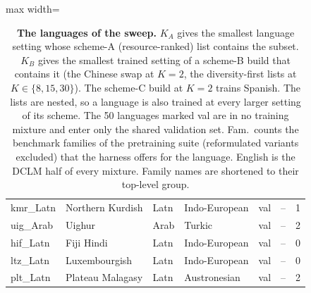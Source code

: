 \begin{table}[p]
\begin{minipage}[t]{0.49\textwidth}
\begin{adjustbox}{max width=\linewidth}
\begin{tabular}[t]{llllrrr}
kmr\_Latn & Northern Kurdish & Latn & Indo-European & val & -- & 1 \\
uig\_Arab & Uighur & Arab & Turkic & val & -- & 2 \\
hif\_Latn & Fiji Hindi & Latn & Indo-European & val & -- & 0 \\
ltz\_Latn & Luxembourgish & Latn & Indo-European & val & -- & 0 \\
plt\_Latn & Plateau Malagasy & Latn & Austronesian & val & -- & 2 \\
\bottomrule
\end{tabular}
\end{adjustbox}
\end{minipage}
\caption{\textbf{The languages of the sweep.} $K_A$ gives the smallest language setting whose scheme-A (resource-ranked) list contains the subset. $K_B$ gives the smallest trained setting of a scheme-B build that contains it (the Chinese swap at $K=2$, the diversity-first lists at $K \in \{8, 15, 30\}$). The scheme-C build at $K=2$ trains Spanish. The lists are nested, so a language is also trained at every larger setting of its scheme. The 50 languages marked val are in no training mixture and enter only the shared validation set. Fam.\ counts the benchmark families of the pretraining suite (reformulated variants excluded) that the harness offers for the language. English is the DCLM half of every mixture. Family names are shortened to their top-level group.}
\label{tab:app-languages}
\end{table}
